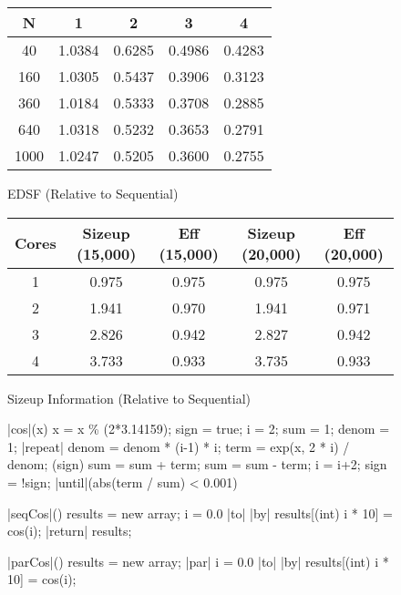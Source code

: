 \documentclass[11pt]{article}
\begin{document}
\begin{figure}[h]
\centering
\begin{tabular}{|c|c|c|c|c|}
\hline
N & 1 & 2 & 3 & 4 \\\hline
40 & 1.0384    & 0.6285  &  0.4986    &0.4283\\\hline
 160 &   1.0305 &   0.5437&    0.3906  &  0.3123\\\hline
 360 &   1.0184   & 0.5333   & 0.3708  &  0.2885\\\hline
  640 &  1.0318   & 0.5232    &0.3653   & 0.2791\\\hline
   1000 & 1.0247   & 0.5205   & 0.3600  &  0.2755\\\hline
   
   \end{tabular}
   \caption{EDSF (Relative to Sequential)}
   \end{figure}

\begin{figure}[h]
\centering
\begin{tabular}{|c|c|c|c|c|}
\hline
Cores & Sizeup (15,000) & Eff (15,000) & Sizeup (20,000) & Eff (20,000) \\\hline
1   &     0.975      &   0.975     &   0.975 & 0.975   \\\hline
 2    &     1.941      & 0.970       &  1.941  & 0.971\\\hline
  3   &    2.826   & 0.942       & 2.827   & 0.942\\\hline
   4    &   3.733     &    0.933    &     3.735  & 0.933\\\hline

\end{tabular}
\caption{Sizeup Information (Relative to Sequential)}
\end{figure}

\begin{figure}[h]
\begin{program}
\PROC |cos|(x) \BODY
	x = x \; \%\; (2*3.14159);
	sign = true;
	i = 2;
	sum = 1;
	denom = 1;
	|repeat| 
		denom = denom * (i-1) * i;
		term = exp(x, 2 * i) / denom;
		\IF (sign) 
		\THEN sum = sum + term;
		\ELSE sum = sum - term;
		\FI
	i = i+2;
	sign = !sign;
	|until|(abs(term / sum) < 0.001)

\END

\PROC |seqCos|() \BODY
	results = new \; array;
	\FOR i = 0.0 \; |to|  \; |by| \DO
		results[(int) i * 10] = cos(i);
	\END
	|return| \; results;
	\END

\PROC |parCos|() \BODY
	results = new \; array;
	|par| \FOR i = 0.0 \; |to| \; |by|  \; \DO
		results[(int) i * 10] = cos(i);
	\END
	\END
\end{program}
\end{figure}
\end{document}
